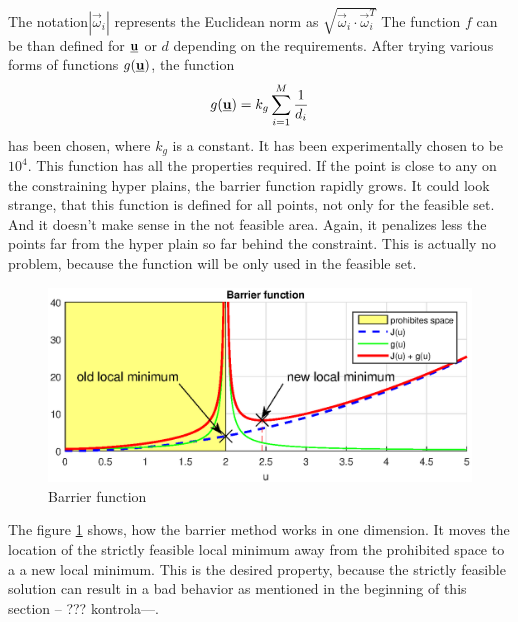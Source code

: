 \documentclass{article}
\newcommand{\uvec}{\textbf{\underline{u}}}
\newcommand{\macoi}{\vec{\omega}_i}
\begin{document}
The notation$|\macoi|$ represents the Euclidean norm as $\sqrt{\macoi \cdot \macoi^T}$ The function $f$ can be than defined for $\uvec$ or $d$ depending on the requirements. After trying various forms of functions $g(\uvec)$, the function
\begin{equation}
\label{eq:barrier_function}
g(\uvec) = k_g\sum_{i = 1}^M \frac{1}{d_i} 
\end{equation}
has been chosen, where $k_g$ is a constant. It has been experimentally chosen to be $10^4$. This function has all the properties required. If the point is close to any on the constraining hyper plains, the barrier function rapidly grows. It could look strange, that this function is defined for all  points, not only for the feasible set. And it doesn't make sense in the not feasible area. Again, it penalizes less the points far from the hyper plain so far behind the constraint. This is actually no problem, because the function will be only used in the feasible set. 
\begin{figure}[h]
\begin{center}
\includegraphics[width=1.1\textwidth]{fig/barrier_function2.eps}
\caption{Barrier function}
\label{fig:barrier_function}
\end{center}
\end{figure}

The figure \ref{fig:barrier_function} shows, how the barrier method works in one dimension. It moves the location of the strictly feasible local minimum away from the prohibited space to a a new local minimum. This is the desired property, because the strictly feasible solution can result in a bad behavior as mentioned in the beginning of this section -- ??? kontrola---. 
\end{document}
